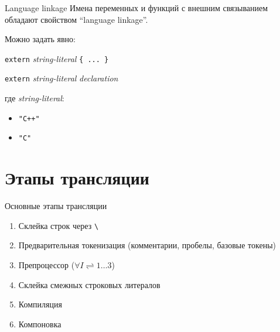 \documentclass[unknownkeysallowed,xcolor=table]{beamer}
\begin{document}
\begin{frame}[fragile]{Language linkage}
  Имена переменных и функций с внешним связыванием обладают свойством ``language linkage''.

  \vspace{1em}

  Можно задать явно: \\

  \vspace{0.7em}

  \lstinline{extern} \emph{string-literal} \lstinline|{ ... }|

  \lstinline{extern} \emph{string-literal} \emph{declaration}

  \vspace{1em}

  где \emph{string-literal}:

  \begin{itemize}
    \item \lstinline{"C++"}
    \item \lstinline{"C"}
  \end{itemize}
\end{frame}

\section{Этапы трансляции}

\begin{frame}[fragile]{Основные этапы трансляции}
  \begin{enumerate}
    \item Склейка строк через \lstinline{\} \vspace{1em}
    \item Предварительная токенизация (комментарии, пробелы, базовые токены) \vspace{1em}
    \item Препроцессор ($\forall I \rightleftharpoons 1\dotso3$) \vspace{1em}
    \item Склейка смежных строковых литералов \vspace{1em}
    \item Компиляция \vspace{1em}
    \item Компоновка
  \end{enumerate}
\end{frame}
\end{document}
